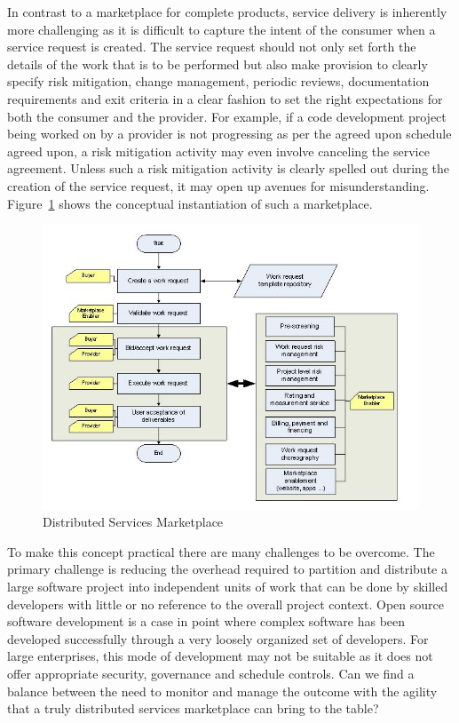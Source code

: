 In contrast to a marketplace for complete products, service delivery is inherently more challenging as it is difficult to capture the intent of the consumer when a service request is created. The service request should not only set forth the details of the work that is to be performed but also make provision to clearly specify risk mitigation, change management, periodic reviews, documentation requirements and exit criteria in a clear fashion to set the right expectations for both the consumer and the provider.  For example, if a code development project being worked on by a provider is not progressing as per the agreed upon schedule agreed upon, a risk mitigation activity may even involve canceling the service agreement. Unless such a risk mitigation activity is clearly spelled out during the creation of the service request, it may open up avenues for misunderstanding. Figure~\ref{glomarketplace} shows the conceptual instantiation of such a marketplace.

 \begin{figure}[H]
\includegraphics[scale=0.4]{figs/glomarketplace.jpg}
\caption{Distributed Services Marketplace}
\label{glomarketplace}
\end{figure}

 To make this concept practical there are many challenges to be overcome. The primary challenge is reducing the overhead required to partition and distribute a large software project into independent units of work that can be done by skilled developers with little or no reference to the overall project context. Open source software development is a case in point where complex software has been developed successfully through a very loosely organized set of developers. For large enterprises, this mode of development may not be suitable as it does not offer appropriate security, governance and schedule controls. Can we find a balance between the need to monitor and manage the outcome with the agility that a truly distributed services marketplace can bring to the table?

